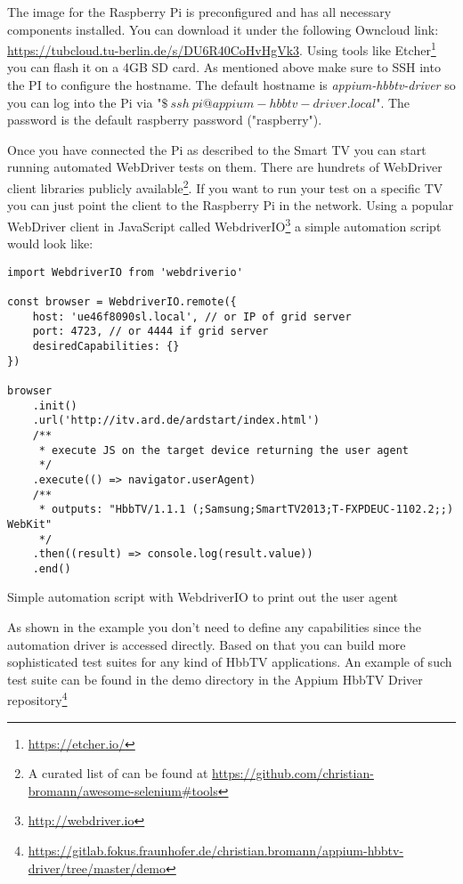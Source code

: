 The image for the Raspberry Pi is preconfigured and has all necessary components installed. You can download it under
the following Owncloud link: \url{https://tubcloud.tu-berlin.de/s/DU6R40CoHvHgVk3}. Using tools like Etcher\footnote{\url{https://etcher.io/}}
you can flash it on a 4GB SD card. As mentioned above make sure to SSH into the PI to configure the hostname. The
default hostname is \textit{appium-hbbtv-driver} so you can log into the Pi via "$\$\ ssh\ pi@appium-hbbtv-driver.local$".
The password is the default raspberry password ("raspberry").

Once you have connected the Pi as described to the Smart TV you can start running automated WebDriver tests on them.
There are hundrets of WebDriver client libraries publicly available\footnote{A curated list of can be found at
\url{https://github.com/christian-bromann/awesome-selenium\#tools}}. If you want to run your test on a specific TV
you can just point the client to the Raspberry Pi in the network. Using a popular WebDriver client in JavaScript called
WebdriverIO\footnote{\url{http://webdriver.io}} a simple automation script would look like:

\begin{listing}[H]
\begin{verbatim}
import WebdriverIO from 'webdriverio'

const browser = WebdriverIO.remote({
    host: 'ue46f8090sl.local', // or IP of grid server
    port: 4723, // or 4444 if grid server
    desiredCapabilities: {}
})

browser
    .init()
    .url('http://itv.ard.de/ardstart/index.html')
    /**
     * execute JS on the target device returning the user agent
     */
    .execute(() => navigator.userAgent)
    /**
     * outputs: "HbbTV/1.1.1 (;Samsung;SmartTV2013;T-FXPDEUC-1102.2;;) WebKit"
     */
    .then((result) => console.log(result.value))
    .end()
\end{verbatim}
\caption{Simple automation script with WebdriverIO to print out the user agent}
\label{lst:wdioExample}
\end{listing}

As shown in the example you don't need to define any capabilities since the automation driver is accessed directly.
Based on that you can build more sophisticated test suites for any kind of HbbTV applications. An example of such
test suite can be found in the demo directory in the Appium HbbTV Driver repository\footnote{\url{https://gitlab.fokus.fraunhofer.de/christian.bromann/appium-hbbtv-driver/tree/master/demo}}

